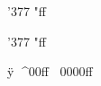 \documentclass{minimal}
\begin{document}
    \char'377
    \char"ff

    \Uchar'377
    \Uchar"ff

    ^^ff
    ^^^^00ff
    ^^^^^^0000ff
\end{document}
